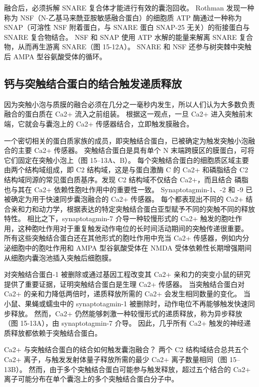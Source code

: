 融合后，必须拆解 SNARE 复合体才能进行有效的囊泡回收。 Rothman 发现一种称为 NSF（N-乙基马来酰亚胺敏感融合蛋白）的细胞质 ATP 酶通过一种称为 SNAP（可溶性 NSF 附着蛋白，与 SNARE 蛋白 SNAP-25 无关）的衔接蛋白与 SNARE 复合物结合。 NSF 和 SNAP 使用 ATP 水解的能量来解离 SNARE 复合物，从而再生游离 SNARE（图 15-12A）。 SNARE 和 NSF 还参与树突棘中突触后 AMPA 型谷氨酸受体的循环。

\subsection{钙与突触结合蛋白的结合触发递质释放}
因为突触小泡与质膜的融合必须在几分之一毫秒内发生，所以人们认为大多数负责融合的蛋白质在 Ca2+ 流入之前组装。 根据这一观点，一旦 Ca2+ 进入突触前末端，它就会与囊泡上的 Ca2+ 传感器结合，立即触发膜融合。

一个密切相关的蛋白质家族的成员，即突触结合蛋白，已被确定为触发突触小泡融合的主要 Ca2+ 传感器。 突触结合蛋白是具有单个 N 末端跨膜区的膜蛋白，可将它们固定在突触小泡上（图 15–13A、B）。 每个突触结合蛋白的细胞质区域主要由两个结构域组成，即 C2 结构域，这是与蛋白激酶 C 的 Ca2+ 和磷脂结合 C2 结构域同源的常见蛋白质基序。发现 C2 结构域不仅结合 Ca2+，而且结合 磷脂也与其在 Ca2+ 依赖性胞吐作用中的重要性一致。 Synaptotagmin-1、-2 和 -9 已被确定为用于快速同步囊泡融合的 Ca2+ 传感器。 每个都表现出不同的 Ca2+ 结合亲和力和动力学，根据表达的特定突触结合蛋白亚型赋予不同的突触不同的释放特性。 相比之下，synaptotagmin-7 介导一种较慢形式的 Ca2+ 触发的胞吐作用，这种胞吐作用对于重复触发动作电位的长时间活动期间的突触传递很重要。 所有这些突触结合蛋白还在其他形式的胞吐作用中充当 Ca2+ 传感器，例如内分泌细胞中的胞吐作用和 AMPA 型谷氨酸受体在 NMDA 受体依赖性长期增强期间从细胞内囊泡池插入突触后细胞膜。

对突触结合蛋白-1 被删除或通过基因工程改变其 Ca2+ 亲和力的突变小鼠的研究提供了重要证据，证明突触结合蛋白是生理 Ca2+ 传感器。 当突触结合蛋白对 Ca2+ 的亲和力降低两倍时，递质释放所需的 Ca2+ 会发生相同数量的变化。 当小鼠、果蝇或蠕虫中的 synaptotagmin-1 被删除时，动作电位不再能够触发快速同步释放。 然而，Ca2+ 仍然能够刺激一种较慢形式的递质释放，称为异步释放（图 15-13A），由 synaptotagmin-7 介导。 因此，几乎所有 Ca2+ 触发的神经递质释放都依赖于突触结合蛋白。

Ca2+ 与突触结合蛋白的结合如何触发囊泡融合？ 两个 C2 结构域结合总共五个 Ca2+ 离子，与触发发射体量子释放所需的最少 Ca2+ 离子数量相同（图 15–13B）。 然而，由于多个突触结合蛋白可能参与触发释放，超过五个结合的 Ca2+ 离子可能分布在单个囊泡上的多个突触结合蛋白分子中。


